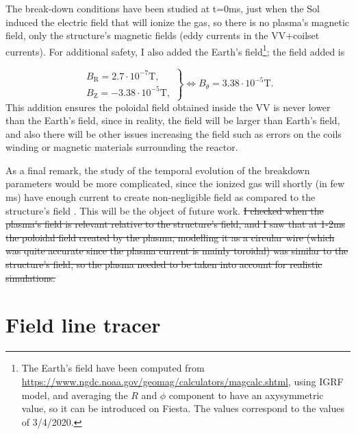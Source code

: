 \documentclass[a4paper,12pt,oneside]{book}
\begin{document}
The break-down conditions have been studied at t=0ms, just when the Sol induced the electric field that will ionize the gas, so there is no plasma's magnetic field, only the structure's magnetic fields (eddy currents in the VV+coilset currents). For additional safety, I also added the Earth's field\footnote{The Earth's field have been computed from \url{https://www.ngdc.noaa.gov/geomag/calculators/magcalc.shtml}, using IGRF model, and averaging the $R$ and $\phi$ component to have an axysymmetric value, so it can be introduced on Fiesta. The values correspond to the values of 3/4/2020.}; the field added is

\begin{equation}
\left.
\begin{array}{c}
B_\text{R}=2.7 \cdot 10^{-7}\text{T}, \\
B_\text{Z}=-3.38 \cdot 10^{-5}\text{T},
\end{array}
\right\}
\Leftrightarrow B_\theta=3.38 \cdot 10^{-5}\text{T}.
\end{equation}
%
This addition ensures the poloidal field obtained inside the VV is never lower than the Earth's field, since in reality, the field will be larger than Earth's field, and also there will be other issues increasing the field such as errors on the coils winding or magnetic materials surrounding the reactor.

As a final remark, the study of the temporal evolution of the breakdown parameters would be more complicated, since the ionized gas will shortly (in few ms) have enough current to create non-negligible field as compared to the structure's field
. This will be the object of future work. \st{I checked when the plasma's field is relevant relative to the structure's field, and I saw that at 1-2ms the poloidal field created by the plasma, modelling it as a circular wire (which was quite accurate since the plasma current is mainly toroidal) was similar to the structure's field, so the plasma needed to be taken into account for realistic simulations.}

\section{Field line tracer}
\end{document}
